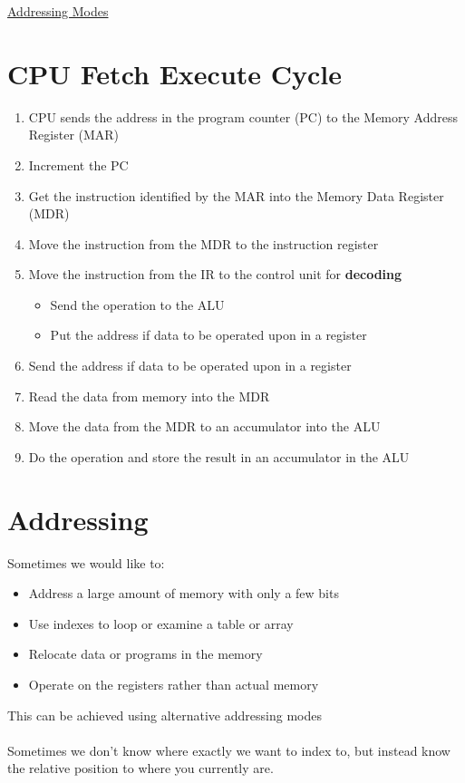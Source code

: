 \documentclass{article}[18pt]
\begin{document}
\begin{center}
\underline{\huge Addressing Modes}
\end{center}
\section{CPU Fetch Execute Cycle}
\begin{enumerate}
	\item CPU sends the address in the program counter (PC) to the Memory Address Register (MAR)
	\item Increment the PC
	\item Get the instruction identified by the MAR into the Memory Data Register (MDR)
	\item Move the instruction from the MDR to the instruction register
	\item Move the instruction from the IR to the control unit for \textbf{decoding}
	\begin{itemize}
		\item Send the operation to the ALU
		\item Put the address if data to be operated upon in a register
	\end{itemize}
	\item Send the address if data to be operated upon in a register
	\item Read the data from memory into the MDR
	\item Move the data from the MDR to an accumulator into the ALU
	\item Do the operation and store the result in an accumulator in the ALU	
	
\end{enumerate}
\section{Addressing}
Sometimes we would like to:
\begin{itemize}
	\item Address a large amount of memory with only a few bits
	\item Use indexes to loop or examine a table or array
	\item Relocate data or programs in the memory
	\item Operate on the registers rather than actual memory
\end{itemize}
This can be achieved using alternative addressing modes\\
\\
Sometimes we don't know where exactly we want to index to, but instead know the relative position to where you currently are.
\end{document}
